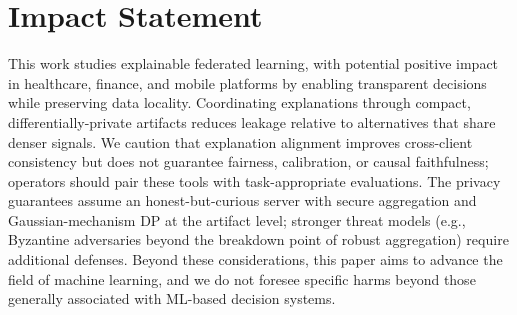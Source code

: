 \documentclass{article}
\theoremstyle{plain}
\theoremstyle{definition}
\theoremstyle{remark}
\begin{document}
\section*{Impact Statement}
This work studies explainable federated learning, with potential positive impact in healthcare, finance, and mobile platforms by enabling transparent decisions while preserving data locality. Coordinating explanations through compact, differentially-private artifacts reduces leakage relative to alternatives that share denser signals. We caution that explanation alignment improves cross-client consistency but does not guarantee fairness, calibration, or causal faithfulness; operators should pair these tools with task-appropriate evaluations. The privacy guarantees assume an honest-but-curious server with secure aggregation and Gaussian-mechanism DP at the artifact level; stronger threat models (e.g., Byzantine adversaries beyond the breakdown point of robust aggregation) require additional defenses. Beyond these considerations, this paper aims to advance the field of machine learning, and we do not foresee specific harms beyond those generally associated with ML-based decision systems.







\appendix
\onecolumn




\end{document}
